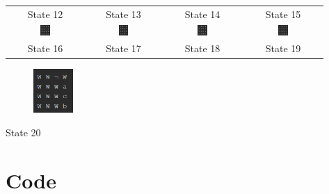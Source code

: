 \documentclass{article}
\begin{document}
\begin{appendices}
\begin{center}
\begin{tabular}{c c c c}
				State 12 & State 13 & State 14 & State 15 \\
				\includegraphics[width=0.135\textwidth,keepaspectratio]{State-16.png} & \includegraphics[width=0.135\textwidth,keepaspectratio]{State-17.png} & \includegraphics[width=0.135\textwidth,keepaspectratio]{State-18.png} & \includegraphics[width=0.135\textwidth,keepaspectratio]{State-19.png} \\
				State 16 & State 17 & State 18 & State 19
			\end{tabular}
		
			\begin{figure}[h]	
				\centering
				\includegraphics[width=0.135\textwidth,keepaspectratio]{State-20.png}
			\end{figure} 
			State 20
		\end{center}
	
		\section{Code}
		\label{appendix:code}
		
	\end{appendices}
	
\end{document}
